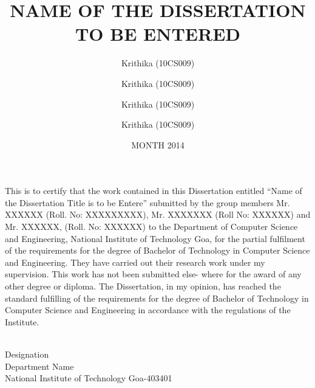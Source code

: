 \documentclass[BTech]{nitgoathesis}
\begin{document}

\title{ NAME OF THE DISSERTATION TO BE ENTERED}

\author{Krithika  \vspace{10pt} (10CS009)}
\author{Krithika  \vspace{10pt} (10CS009)}
\author{Krithika  \vspace{10pt} (10CS009)}
\author{Krithika  \vspace{10pt} (10CS009)}

\date{MONTH 2014}

\maketitle

\certificate

\vspace*{0.5in}

\noindent This is to certify that the work contained in this Dissertation entitled ``Name of the Dissertation Title is to be Entere'' 
submitted by the group members Mr. XXXXXX (Roll. No: XXXXXXXXX), Mr. XXXXXXX (Roll No: XXXXXX) and Mr. XXXXXX, (Roll. No: XXXXXX) to the 
Department of Computer Science and Engineering, National Institute of Technology Goa, for the partial fulfilment of the requirements for 
the degree of Bachelor of Technology in Computer Science and Engineering. They have carried out their research work under my 
supervision. This work has not been submitted else- where for the award of any other degree or diploma.\newline
\noindent The Dissertation, in my opinion, has reached the standard fulfilling of the requirements for the degree of Bachelor of 
Technology in Computer Science and Engineering in accordance with the regulations of the Institute.

\vspace*{1.5in}

\begin{singlespacing}
\hspace*{2.8in}
\parbox{3in}{
 \\
\noindent Designation \\ 
\noindent Department Name \\
\noindent National Institute of Technology Goa-403401\\
\noindent  \\
} 
\end{singlespacing}
\end{document}
